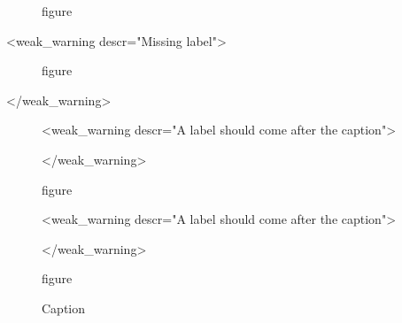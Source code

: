 \documentclass{article}
\begin{document}
    \begin{figure}
        \caption{figure}
        \label{fig:good-label}
    \end{figure}

    <weak_warning descr="Missing label">\begin{figure}
        \caption{figure}
    \end{figure}</weak_warning>

    \begin{figure}
        <weak_warning descr="A label should come after the caption">\label{fig:wrong-label}
        \caption{figure}</weak_warning>
    \end{figure}

    \begin{figure}
        <weak_warning descr="A label should come after the caption">\label{fig:wrong-label2}\caption{figure}</weak_warning>
    \end{figure}

    \begin{figure}[ht]
        \centering
        \caption{Caption}\label{fig:figure}
    \end{figure}
\end{document}
